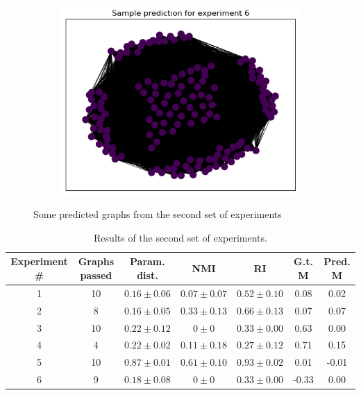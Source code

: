 \documentclass[switch, 12pt]{article}
\begin{document}
\begin{figure}[h]
\begin{subfigure}{0.28\linewidth}
        \includegraphics[width=\linewidth]{figures/exp6_pred.png}
    \end{subfigure}
    \hfill
    \caption{Some predicted graphs from the second set of experiments}
    \label{fig:pred_graphs}
\end{figure}

\begin{table}[h]
    \centering
    \setlength\heavyrulewidth{0.25ex}
    \begin{tabular}{@{}ccccccc@{}}
        \toprule
        Experiment \# & Graphs passed           & Param. dist.                         & NMI             & RI               & G.t. M & Pred. M \\ \midrule
        1             & \multicolumn{1}{c|}{10} & \multicolumn{1}{c|}{$0.16 \pm 0.06$} & $0.07 \pm 0.07$ & $0.52 \pm  0.10$ & 0.08   & 0.02    \\
        2             & \multicolumn{1}{c|}{8}  & \multicolumn{1}{c|}{$0.16 \pm 0.05$} & $0.33 \pm 0.13$ & $0.66 \pm 0.13$  & 0.07   & 0.07    \\
        3             & \multicolumn{1}{c|}{10} & \multicolumn{1}{c|}{$0.22 \pm 0.12$} & $0 \pm 0$       & $0.33 \pm 0.00$  & 0.63   & 0.00    \\
        4             & \multicolumn{1}{c|}{4}  & \multicolumn{1}{c|}{$0.22 \pm 0.02$} & $0.11 \pm 0.18$ & $0.27 \pm 0.12$  & 0.71   & 0.15    \\
        5             & \multicolumn{1}{c|}{10} & \multicolumn{1}{c|}{$0.87 \pm 0.01$} & $0.61 \pm 0.10$ & $0.93 \pm 0.02$  & 0.01   & -0.01   \\
        6             & \multicolumn{1}{c|}{9}  & \multicolumn{1}{c|}{$0.18 \pm 0.08$} & $0 \pm 0$       & $0.33 \pm 0.00$  & -0.33  & 0.00    \\ \bottomrule
    \end{tabular}
    \caption{Results of the second set of experiments.}
    \label{tab:sbm_results}
\end{table}
\end{document}
